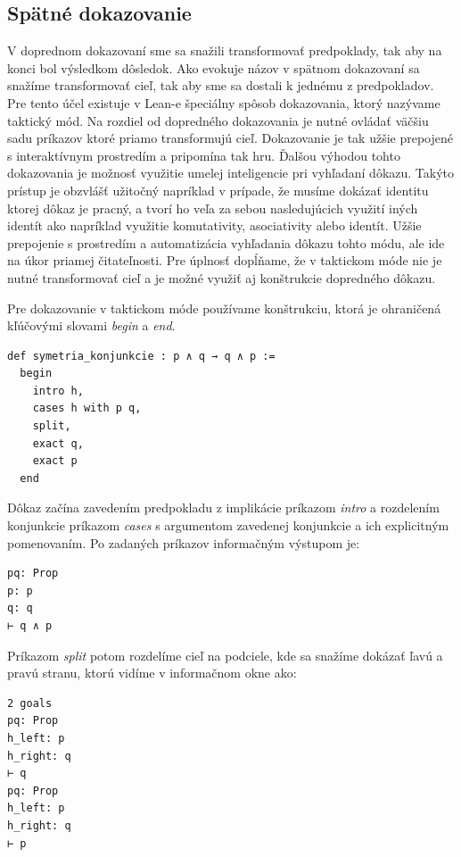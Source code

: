 \documentclass[a4paper,10pt,oneside]{report}%
\begin{document}
\subsection{Spätné dokazovanie}

    V doprednom dokazovaní sme sa snažili transformovať predpoklady, tak aby na konci
bol výsledkom dôsledok.
    Ako evokuje názov v spätnom dokazovaní sa snažíme transformovať cieľ, tak aby sme
sa dostali k jednému z predpokladov.
    Pre tento účel existuje v Lean-e špeciálny spôsob dokazovania, ktorý nazývame taktický
mód.
    Na rozdiel od dopredného dokazovania je nutné ovládať väčšiu sadu príkazov ktoré
priamo transformujú cieľ.
    Dokazovanie je tak užšie prepojené s interaktívnym prostredím a pripomína tak hru.
    Ďalšou výhodou tohto dokazovania je možnosť využitie umelej inteligencie pri vyhľadaní
dôkazu.
    Takýto prístup je obzvlášť užitočný napríklad v prípade, že musíme dokázať identitu
ktorej dôkaz je pracný, a tvorí ho veľa za sebou nasledujúcich využití iných
identít ako napríklad využitie komutativity, asociativity alebo identít.
    Užšie prepojenie s prostredím a automatizácia vyhľadania dôkazu tohto módu, ale
ide na úkor priamej čitateľnosti.
    Pre úplnosť dopĺňame, že v taktickom móde nie je nutné transformovať cieľ a je možné
využiť aj konštrukcie dopredného dôkazu.

    Pre dokazovanie v taktickom móde používame konštrukciu, ktorá je ohraničená
kľúčovými slovami \emph{begin} a \emph{end}.

\begin{lstlisting}
def symetria_konjunkcie : p ∧ q → q ∧ p :=
  begin
    intro h,
    cases h with p q,
    split,
    exact q,
    exact p
  end
\end{lstlisting}

    Dôkaz začína zavedením predpokladu z implikácie príkazom \emph{intro} a
rozdelením konjunkcie príkazom \emph{cases} s argumentom zavedenej konjunkcie a
ich explicitným pomenovaním. Po zadaných príkazov informačným výstupom je:

\begin{lstlisting}
pq: Prop
p: p
q: q
⊢ q ∧ p
\end{lstlisting}

Príkazom \emph{split} potom rozdelíme cieľ na podciele, kde sa snažíme dokázať
ľavú a pravú stranu, ktorú vidíme v informačnom okne ako:

\begin{lstlisting}
2 goals
pq: Prop
h_left: p
h_right: q
⊢ q
pq: Prop
h_left: p
h_right: q
⊢ p
\end{lstlisting}
\end{document}
